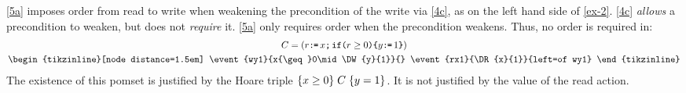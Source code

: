\ref{5a} imposes order from read to write when weakening the
precondition of the write via \ref{4c}, as on the left hand side of
\eqref{ex-2}.
\ref{4c} \emph{allows} a precondition to weaken, but does not \emph{require} it.
\ref{5a} only requires order when the precondition weakens.
Thus, no order is required in: %
\begin{gather*}
  \aCmd=(r\GETS x\SEMI\IF{r\geq0}\THEN y\GETS1 \FI)
  \\
  \nonumber
  \hbox{\begin{tikzinline}[node distance=1.5em]
      \event{wy1}{x{\geq}0\mid\DW{y}{1}}{}
      \event{rx1}{\DR{x}{1}}{left=of wy1}
    \end{tikzinline}}
\end{gather*}
The existence of this pomset is justified
by the Hoare triple $\{x\geq0\}\allowbreak\;C\;\allowbreak\{y=1\}$.  It is not justified by the value of the read
action.  


